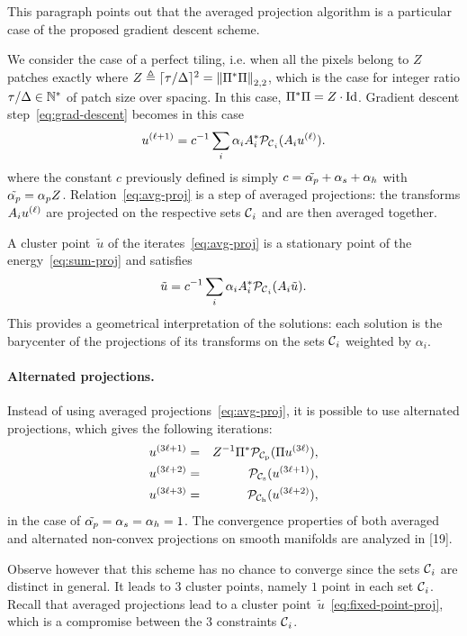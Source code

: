 This paragraph points out that the averaged projection algorithm is a particular case of the proposed gradient descent scheme.

We consider the case of a perfect tiling, i.e. when all the pixels belong to $Z$ patches exactly where  $Z \triangleq \lceil\tau/\Delta\rceil^2 = \left\|\Pi^*\Pi\right\|_{2,2}$, which is the case for integer ratio $\tau/\Delta\in\mathbb{N}^*$ of patch size over spacing.
In this case, $\Pi^*\Pi = Z\cdot\operatorname*{Id}$.
Gradient descent step~\eqref{eq:grad-descent} becomes in this case
\begin{equation}
  \label{eq:avg-proj}
  u^{\left(\ell+1\right)} = c^{-1} \sum_i \alpha_i A_i^* \mathcal{P}_{{{\mathcal{C}_{\mathrm{}}}}_i}(A_i u^{\left(\ell\right)}).
\end{equation}
where the constant $c$ previously defined is simply $c = \tilde{\alpha_p} + \alpha_s + \alpha_h$ with $\tilde{\alpha_p}=\alpha_p Z$.
Relation~\eqref{eq:avg-proj} is a step of averaged projections: the transforms $A_i u^{\left(\ell\right)}$ are projected on the respective sets ${{{\mathcal{C}_{\mathrm{}}}}_i}$ and are then averaged together.

A cluster point~$\tilde{u}$ of the iterates~\eqref{eq:avg-proj} is a stationary point of the energy~\eqref{eq:sum-proj} and satisfies
\begin{equation}
  \label{eq:fixed-point-proj}
  \tilde{u} = c^{-1} \sum_i \alpha_i A_i^* \mathcal{P}_{{{\mathcal{C}_{\mathrm{}}}}_i}(A_i \tilde{u}).
\end{equation}
This provides a geometrical interpretation of the solutions: each solution is the barycenter of the projections of its transforms on the sets ${{{\mathcal{C}_{\mathrm{}}}}_i}$ weighted by $\alpha_i$.


\paragraph{Alternated projections.}

Instead of using averaged projections~\eqref{eq:avg-proj}, it is possible to use alternated projections, which gives the following iterations:
\begin{eqnarray*}
  u^{(3\ell+1)} &=& Z^{-1} \Pi^* \mathcal{P}_{\mathcal{C}_{\mathrm{p}}}(\Pi u^{(3\ell)}), \\
  u^{(3\ell+2)} &=& \mathcal{P}_{\mathcal{C}_{\mathrm{s}}}(u^{(3\ell+1)}), \\
  u^{(3\ell+3)} &=& \mathcal{P}_{\mathcal{C}_{\mathrm{h}}}(u^{(3\ell+2)}),
\end{eqnarray*}
in the case of $\tilde{\alpha_p}=\alpha_s=\alpha_h=1$.
The convergence properties of both averaged and alternated non-convex projections on smooth manifolds are analyzed in [19].

Observe however that this scheme has no chance to converge since the sets ${{{\mathcal{C}_{\mathrm{}}}}_i}$ are distinct in general.
It leads to $3$ cluster points, namely $1$ point in each set ${{{\mathcal{C}_{\mathrm{}}}}_i}$.
Recall that averaged projections lead to a cluster point~$\tilde{u}$~\eqref{eq:fixed-point-proj}, which is a compromise between the $3$ constraints ${{{\mathcal{C}_{\mathrm{}}}}_i}$.

